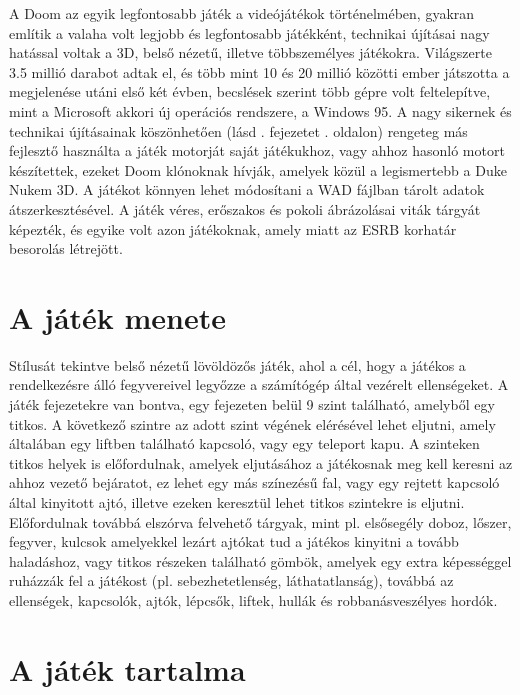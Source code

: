 \documentclass{thesis-ekf}
\theoremstyle{definition}
\theoremstyle{remark}
\begin{document}
A Doom az egyik legfontosabb játék a videójátékok történelmében, gyakran említik
a valaha volt legjobb és legfontosabb játékként, technikai újításai nagy
hatással voltak a 3D, belső nézetű, illetve többszemélyes játékokra. Világszerte
3.5 millió darabot adtak el, és több mint 10 és 20 millió közötti ember
játszotta a megjelenése utáni első két évben, becslések szerint több gépre volt
feltelepítve, mint a Microsoft akkori új operációs rendszere, a Windows 95. A
nagy sikernek és technikai újításainak köszönhetően (lásd .
fejezetet . oldalon) rengeteg más fejlesztő használta a
játék motorját saját játékukhoz, vagy ahhoz hasonló motort készítettek, ezeket
Doom klónoknak hívják, amelyek közül a legismertebb a Duke Nukem 3D. A játékot
könnyen lehet módosítani a WAD fájlban tárolt adatok átszerkesztésével. A játék
véres, erőszakos és pokoli ábrázolásai viták tárgyát képezték, és egyike volt
azon játékoknak, amely miatt az ESRB korhatár besorolás létrejött.
\cite[Bevezető]{doomgame}

\section{A játék menete}

Stílusát tekintve belső nézetű lövöldözős játék, ahol a cél, hogy a játékos a
rendelkezésre álló fegyvereivel legyőzze a számítógép által vezérelt
ellenségeket. A játék fejezetekre van bontva, egy fejezeten belül 9 szint
található, amelyből egy titkos. A következő szintre az adott szint végének
elérésével lehet eljutni, amely általában egy liftben található kapcsoló, vagy
egy teleport kapu. A szinteken titkos helyek is előfordulnak, amelyek
eljutásához a játékosnak meg kell keresni az ahhoz vezető bejáratot, ez lehet
egy más színezésű fal, vagy egy rejtett kapcsoló által kinyitott ajtó, illetve
ezeken keresztül lehet titkos szintekre is eljutni. Előfordulnak továbbá
elszórva felvehető tárgyak, mint pl. elsősegély doboz, lőszer, fegyver, kulcsok
amelyekkel lezárt ajtókat tud a játékos kinyitni a tovább haladáshoz, vagy
titkos részeken található gömbök, amelyek egy extra képességgel ruházzák fel a
játékost (pl. sebezhetetlenség, láthatatlanság), továbbá az ellenségek,
kapcsolók, ajtók, lépcsők, liftek, hullák és robbanásveszélyes hordók.
\cite[Játékmenet]{doomgame}

\section{A játék tartalma}
\end{document}
